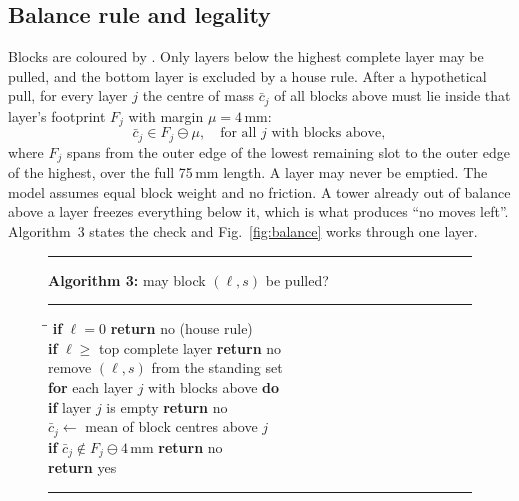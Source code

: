 \documentclass[conference,10pt]{IEEEtran}
\newcommand{\code}[1]{\texttt{\small\detokenize{#1}}}
\begin{document}
\subsection{Balance rule and legality}\label{sec:balance}
Blocks are coloured by \code{jenga_rules.py}. Only layers below the highest complete layer may be pulled, and the bottom layer is excluded by a house rule. After a hypothetical pull, for every layer $j$ the centre of mass $\bar c_j$ of all blocks above must lie inside that layer's footprint $F_j$ with margin $\mu=4$\,mm:
\begin{equation}
\bar c_j\in F_j\ominus\mu,\quad \text{for all } j \text{ with blocks above},
\end{equation}
where $F_j$ spans from the outer edge of the lowest remaining slot to the outer edge of the highest, over the full 75\,mm length. A layer may never be emptied. The model assumes equal block weight and no friction. A tower already out of balance above a layer freezes everything below it, which is what produces ``no moves left''. Algorithm~3 states the check and Fig.~\ref{fig:balance} works through one layer.

\begin{figure}[!t]\centering\footnotesize
\begin{minipage}{\columnwidth}\hrule\smallskip
\textbf{Algorithm 3:} may block $(\ell,s)$ be pulled?\smallskip\hrule\smallskip
\begin{tabbing}
\hspace{3mm}\=\hspace{3mm}\=\kill
\textbf{if} $\ell=0$ \textbf{return} no (house rule)\\
\textbf{if} $\ell\geq$ top complete layer \textbf{return} no\\
remove $(\ell,s)$ from the standing set\\
\textbf{for} each layer $j$ with blocks above \textbf{do}\\
\>\textbf{if} layer $j$ is empty \textbf{return} no\\
\>$\bar c_j\gets$ mean of block centres above $j$\\
\>\textbf{if} $\bar c_j\notin F_j\ominus 4$\,mm \textbf{return} no\\
\textbf{return} yes
\end{tabbing}\hrule
\end{minipage}
\end{figure}
\end{document}
